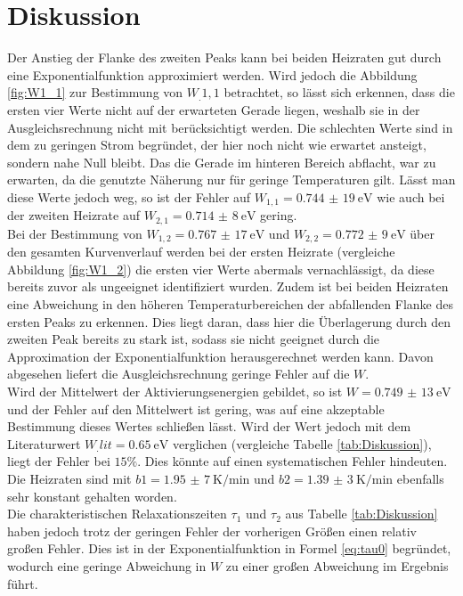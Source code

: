 
\section{Diskussion}
\label{sec:Diskussion}

Der Anstieg der Flanke des zweiten Peaks kann bei beiden Heizraten gut durch eine Exponentialfunktion approximiert werden. Wird jedoch die Abbildung \ref{fig:W1_1} zur Bestimmung von $W_.{1,1}$ betrachtet, so lässt sich erkennen, dass die ersten vier Werte nicht auf der erwarteten Gerade liegen, weshalb sie in der Ausgleichsrechnung nicht mit berücksichtigt werden. Die schlechten Werte sind in dem zu geringen Strom begründet, der hier noch nicht wie erwartet ansteigt, sondern nahe Null bleibt. Das die Gerade im hinteren Bereich abflacht, war zu erwarten, da die genutzte Näherung nur für geringe Temperaturen gilt. Lässt man diese Werte jedoch weg, so ist der Fehler auf $W_{1,1}=\SI{0,744(19)}{\electronvolt}$ wie auch bei der zweiten Heizrate auf $W_{2,1}=\SI{0,714(8)}{\electronvolt}$ gering.\\
Bei der Bestimmung von $W_{1,2}=\SI{0,767(17)}{\electronvolt}$ und $W_{2,2}=\SI{0,772(9)}{\electronvolt}$ über den gesamten Kurvenverlauf werden bei der ersten Heizrate (vergleiche Abbildung \ref{fig:W1_2}) die ersten vier Werte abermals vernachlässigt, da diese bereits zuvor als ungeeignet identifiziert wurden. Zudem ist bei beiden Heizraten eine Abweichung in den höheren Temperaturbereichen der abfallenden Flanke des ersten Peaks zu erkennen. Dies liegt daran, dass hier die Überlagerung durch den zweiten Peak bereits zu stark ist, sodass sie nicht geeignet durch die Approximation der Exponentialfunktion herausgerechnet werden kann. Davon abgesehen liefert die Ausgleichsrechnung geringe Fehler auf die $W$.\\
Wird der Mittelwert der Aktivierungsenergien gebildet, so ist $W=\SI{0,749(13)}{\electronvolt}$ und der Fehler auf den Mittelwert ist gering, was auf eine akzeptable Bestimmung dieses Wertes schließen lässt. Wird der Wert jedoch mit dem Literaturwert $W_.{lit}=\SI{0,65}{\eV}$ \cite{DipolW} verglichen (vergleiche Tabelle \ref{tab:Diskussion}), liegt der Fehler bei $15\%$. Dies könnte auf einen systematischen Fehler hindeuten. Die Heizraten sind mit $b1=\SI{1,95(7)}{\kelvin\per\minute}$ und $b2=\SI{1,39(3)}{\kelvin\per\minute}$ ebenfalls sehr konstant gehalten worden.\\
Die charakteristischen Relaxationszeiten $\tau_1$ und $\tau_2$ aus Tabelle \ref{tab:Diskussion} haben jedoch trotz der geringen Fehler der vorherigen Größen einen relativ großen Fehler. Dies ist in der Exponentialfunktion in Formel \eqref{eq:tau0} begründet, wodurch eine geringe Abweichung in $W$ zu einer großen Abweichung im Ergebnis führt.
